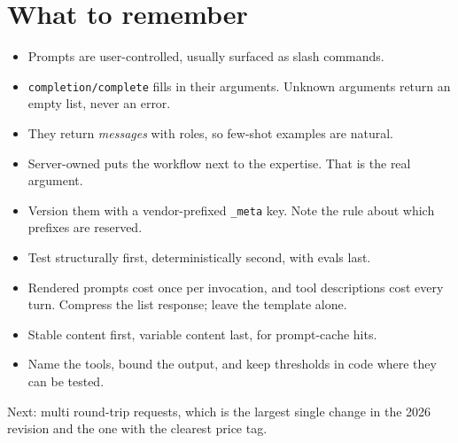 \section{What to remember}

\begin{itemize}[leftmargin=1.6em, itemsep=3pt]
\item Prompts are user-controlled, usually surfaced as slash commands.
\item \texttt{completion/complete} fills in their arguments. Unknown arguments
return an empty list, never an error.
\item They return \emph{messages} with roles, so few-shot examples are natural.
\item Server-owned puts the workflow next to the expertise. That is the real
argument.
\item Version them with a vendor-prefixed \texttt{\_meta} key. Note the rule
about which prefixes are reserved.
\item Test structurally first, deterministically second, with evals last.
\item Rendered prompts cost once per invocation, and tool descriptions cost
every turn. Compress the list response; leave the template alone.
\item Stable content first, variable content last, for prompt-cache hits.
\item Name the tools, bound the output, and keep thresholds in code where they
can be tested.
\end{itemize}

Next: multi round-trip requests, which is the largest single change in the 2026
revision and the one with the clearest price tag.

